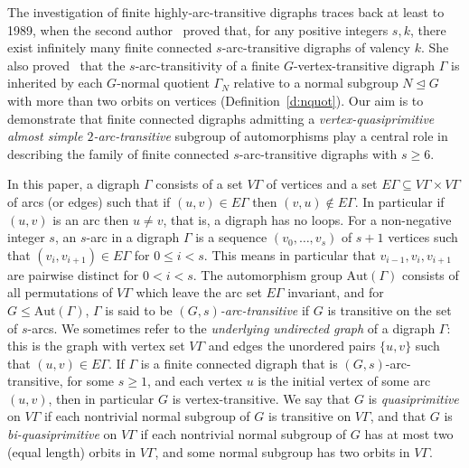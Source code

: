 \documentclass[11pt]{amsart}
\newcommand{\Aut}{\mathrm{Aut}}
\begin{document}
The investigation of finite highly-arc-transitive digraphs traces back at least to 1989, when the second author~\cite[Theorem 2.8]{Praeger} proved that, for any positive integers \(s, k\), there exist  infinitely many finite connected \(s\)-arc-transitive digraphs of valency \(k\). She also proved~\cite[Lemma 3.2]{Praeger} that the \(s\)-arc-transitivity of a finite \(G\)-vertex-transitive digraph \(\Gamma\) is inherited by each $G$-normal quotient $\Gamma_N$ relative to a normal subgroup \(N\unlhd G\) with more than two orbits on vertices (Definition~\ref{d:nquot}). Our aim is to demonstrate that finite connected digraphs admitting a \emph{vertex-quasiprimitive almost simple $2$-arc-transitive} subgroup of automorphisms play a central role in describing the family of finite connected $s$-arc-transitive digraphs with $s\geq6$. 

In this paper, a digraph $\Gamma$ consists of a set $V\Gamma$ of vertices and a set $E\Gamma \subseteq V\Gamma\times V\Gamma$ of
arcs (or edges) such that  if $(u,v) \in E\Gamma$ then  $(v,u) \not\in E\Gamma$. In particular if $(u,v)$ is an arc then $u\ne v$, that is, a digraph has no loops. For a non-negative integer $s$, an $s$-arc in a digraph $\Gamma$ is a sequence $(v_0,\dots,v_s)$ of $s+1$ vertices such
that $(v_i,v_{i+1}) \in E\Gamma$ for $0 \leqslant i < s$. This means in particular that $v_{i-1}, v_i,v_{i+1}$ are pairwise distinct for $0< i < s$. The automorphism group $\Aut(\Gamma)$ consists of all permutations of $V\Gamma$ which leave the arc set $E\Gamma$ invariant, and for $G\leq \Aut(\Gamma)$, $\Gamma$ is said to be \emph{$(G,s)$-arc-transitive} if $G$ is transitive on the set of $s$-arcs. We sometimes refer to the \emph{underlying undirected graph} of a digraph $\Gamma$: this is the graph with vertex set  $V\Gamma$ and edges the unordered pairs $\{u,v\}$ such that $(u,v)\in E\Gamma$.  If $\Gamma$ is a finite connected digraph that is $(G,s)$-arc-transitive, for some $s\geq1$, and each vertex $u$ is the initial vertex of some arc $(u,v)$, then in particular $G$ is vertex-transitive. We say that $G$ is \emph{quasiprimitive} on $V\Gamma$ if each nontrivial normal subgroup of $G$ is transitive on $V\Gamma$, and that $G$ is \emph{bi-quasiprimitive} on $V\Gamma$ if each nontrivial normal subgroup of $G$ has at most two (equal length) orbits in $V\Gamma$, and some normal subgroup has two orbits in $V\Gamma$.  
\end{document}
